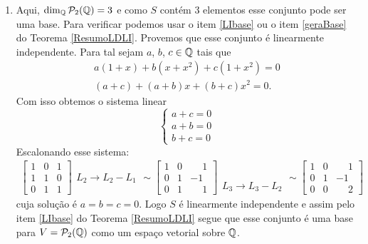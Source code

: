 \begin{exemplos}
\begin{solucao}
\begin{enumerate}
      \item Aqui, $\dim_{\mathbb{Q}}\mathcal{P}_2(\mathbb{Q}) = 3$ e como $S$ contém 3 elementos esse conjunto pode ser uma base. Para verificar podemos usar o item \ref{LIbase} ou o item \ref{geraBase} do Teorema \ref{ResumoLDLI}. Provemos que esse conjunto é linearmente independente. Para tal sejam $a$, $b$, $c \in \mathbb{Q}$ tais que
        \begin{align*}
          a(1 + x) + b(x + x^2) + c(1 + x^2) = 0\\
          (a + c) + (a + b)x + (b + c)x^2 = 0.
        \end{align*}
        Com isso obtemos o sistema linear
        \[
          \begin{cases}
            a + c = 0\\
            a + b = 0\\
            b + c = 0
          \end{cases}
        \]
        Escalonando esse sistema:
        \begin{align*}
          \begin{bmatrix}
            1 & 0 & 1\\
            1 & 1 & 0\\
            0 & 1 & 1
          \end{bmatrix}
          \begin{array}{l}
            \phantom{x}\\L_2 \to L_2 - L_1\\\phantom{x}
          \end{array}\sim
          \begin{bmatrix}
            1 & 0 & \phantom{-} 1\\
            0 & 1 & -1\\
            0 & 1 & \phantom{-} 1
          \end{bmatrix}
          \begin{array}{l}
            \phantom{x}\\\phantom{x}\\L_3 \to L_3 - L_2
          \end{array}\sim
          \begin{bmatrix}
            1 & 0 & \phantom{-} 1\\
            0 & 1 & -1\\
            0 & 0 & \phantom{-} 2
          \end{bmatrix}
        \end{align*}
        cuja solução é $a = b = c = 0$. Logo $S$ é linearmente independente e assim pelo item \ref{LIbase} do Teorema \ref{ResumoLDLI} segue que esse conjunto é uma base para $V = \mathcal{P}_2(\mathbb{Q})$ como um espaço vetorial sobre $\mathbb{Q}$.
    \end{enumerate}
  \end{solucao}
\end{exemplos}

